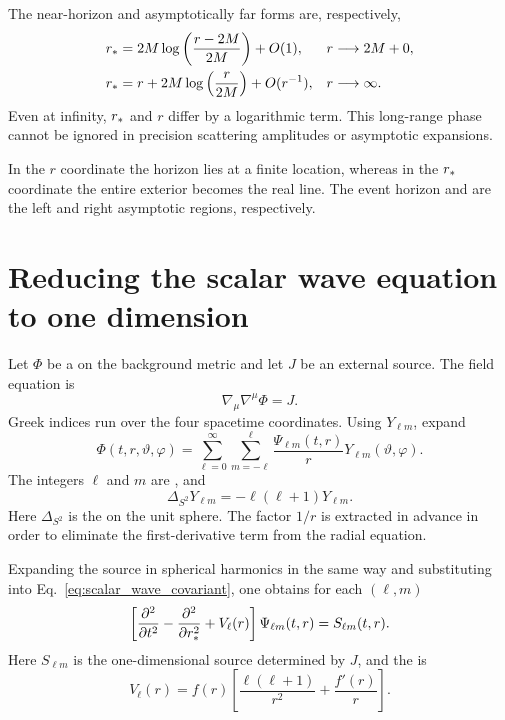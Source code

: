 The near-horizon and asymptotically far forms are, respectively,
\begin{align}
r_*
&=
2M\log\left(\frac{r-2M}{2M}\right)
+O(1),
&& r\longrightarrow 2M+0,
\label{eq:schwarzschild_tortoise_hor}
\\
r_*
&=
r+2M\log\left(\frac{r}{2M}\right)
+O(r^{-1}),
&& r\longrightarrow\infty.
\label{eq:schwarzschild_tortoise_inf}
\end{align}
Even at infinity, $r_*$ and $r$ differ by a logarithmic term. This long-range phase cannot be ignored in precision scattering amplitudes or asymptotic expansions.

In the $r$ coordinate the horizon lies at a finite location, whereas in the $r_*$ coordinate the entire exterior becomes the real line. The event horizon and  are the left and right asymptotic regions, respectively.

\section{Reducing the scalar wave equation to one dimension}

Let $\Phi$ be a  on the background metric and let $J$ be an external source. The field equation is
\begin{equation}
\nabla_\mu\nabla^\mu\Phi
=
J.
\label{eq:scalar_wave_covariant}
\end{equation}
Greek indices run over the four spacetime coordinates. Using  $Y_{\ell m}$, expand
\begin{equation}
\Phi(t,r,\vartheta,\varphi)
=
\sum_{\ell=0}^{\infty}
\sum_{m=-\ell}^{\ell}
\frac{\Psi_{\ell m}(t,r)}{r}
Y_{\ell m}(\vartheta,\varphi).
\label{eq:scalar_decomposition}
\end{equation}
The integers $\ell$ and $m$ are , and
\begin{equation}
\Delta_{S^2}Y_{\ell m}
=
-\ell(\ell+1)Y_{\ell m}.
\end{equation}
Here $\Delta_{S^2}$ is the  on the unit sphere. The factor $1/r$ is extracted in advance in order to eliminate the first-derivative term from the radial equation.

Expanding the source in spherical harmonics in the same way and substituting into Eq.~\eqref{eq:scalar_wave_covariant}, one obtains for each $(\ell,m)$
\begin{equation}
\left[
\frac{\partial^2}{\partial t^2}
-\frac{\partial^2}{\partial r_*^2}
+V_\ell(r)
\right]
\Psi_{\ell m}(t,r)
=
S_{\ell m}(t,r).
\label{eq:master_wave_time}
\end{equation}
Here $S_{\ell m}$ is the one-dimensional source determined by $J$, and the  is
\begin{equation}
V_\ell(r)
=
f(r)
\left[
\frac{\ell(\ell+1)}{r^2}
+\frac{f'(r)}{r}
\right].
\label{eq:scalar_effective_potential}
\end{equation}

